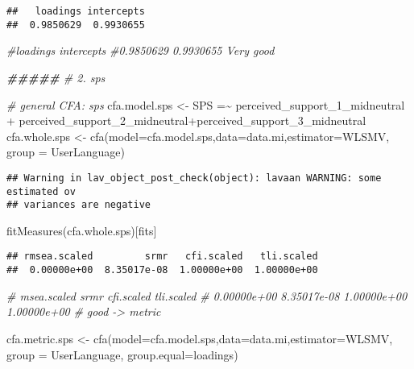 \documentclass[
]{article}
\newenvironment{Shaded}{\begin{snugshade}}{\end{snugshade}}
\newcommand{\AttributeTok}[1]{\textcolor[rgb]{0.77,0.63,0.00}{#1}}
\newcommand{\CommentTok}[1]{\textcolor[rgb]{0.56,0.35,0.01}{\textit{#1}}}
\newcommand{\DocumentationTok}[1]{\textcolor[rgb]{0.56,0.35,0.01}{\textbf{\textit{#1}}}}
\newcommand{\FunctionTok}[1]{\textcolor[rgb]{0.00,0.00,0.00}{#1}}
\newcommand{\NormalTok}[1]{#1}
\newcommand{\OtherTok}[1]{\textcolor[rgb]{0.56,0.35,0.01}{#1}}
\newcommand{\StringTok}[1]{\textcolor[rgb]{0.31,0.60,0.02}{#1}}
\begin{document}
\begin{verbatim}
##   loadings intercepts 
##  0.9850629  0.9930655
\end{verbatim}

\begin{Shaded}
\begin{Highlighting}[]
\CommentTok{\#loadings intercepts }
\CommentTok{\#0.9850629  0.9930655  Very good}


\DocumentationTok{\#\#\#\#\#}
\CommentTok{\# 2. sps}

\CommentTok{\# general CFA: sps}
\NormalTok{cfa.model.sps }\OtherTok{\textless{}{-}} \StringTok{\textquotesingle{}SPS =\textasciitilde{} perceived\_support\_1\_midneutral + }
\StringTok{  perceived\_support\_2\_midneutral+perceived\_support\_3\_midneutral\textquotesingle{}}
\NormalTok{cfa.whole.sps }\OtherTok{\textless{}{-}} \FunctionTok{cfa}\NormalTok{(}\AttributeTok{model=}\NormalTok{cfa.model.sps,}\AttributeTok{data=}\NormalTok{data.mi,}\AttributeTok{estimator=}\StringTok{\textquotesingle{}WLSMV\textquotesingle{}}\NormalTok{, }\AttributeTok{group =} 
                       \StringTok{\textquotesingle{}UserLanguage\textquotesingle{}}\NormalTok{)}
\end{Highlighting}
\end{Shaded}

\begin{verbatim}
## Warning in lav_object_post_check(object): lavaan WARNING: some estimated ov
## variances are negative
\end{verbatim}

\begin{Shaded}
\begin{Highlighting}[]
\FunctionTok{fitMeasures}\NormalTok{(cfa.whole.sps)[fits]}
\end{Highlighting}
\end{Shaded}

\begin{verbatim}
## rmsea.scaled         srmr   cfi.scaled   tli.scaled 
##  0.00000e+00  8.35017e-08  1.00000e+00  1.00000e+00
\end{verbatim}

\begin{Shaded}
\begin{Highlighting}[]
\CommentTok{\# msea.scaled         srmr   cfi.scaled   tli.scaled }
\CommentTok{\#  0.00000e+00  8.35017e{-}08  1.00000e+00  1.00000e+00 }
\CommentTok{\# good {-}\textgreater{} metric}

\NormalTok{cfa.metric.sps }\OtherTok{\textless{}{-}} \FunctionTok{cfa}\NormalTok{(}\AttributeTok{model=}\NormalTok{cfa.model.sps,}\AttributeTok{data=}\NormalTok{data.mi,}\AttributeTok{estimator=}\StringTok{\textquotesingle{}WLSMV\textquotesingle{}}\NormalTok{, }\AttributeTok{group =} 
                        \StringTok{\textquotesingle{}UserLanguage\textquotesingle{}}\NormalTok{, }\AttributeTok{group.equal=}\StringTok{\textquotesingle{}loadings\textquotesingle{}}\NormalTok{)}
\end{Highlighting}
\end{Shaded}
\end{document}
